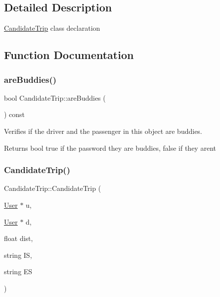 \subsection{Detailed Description}
\hyperlink{class_candidate_trip}{Candidate\+Trip} class declaration 

\subsection{Function Documentation}
\mbox{\label{group___candidate_trip_ga5857725c938706a05eddef0102bf9456}} 
\subsubsection{\texorpdfstring{are\+Buddies()}{areBuddies()}}
{\footnotesize\ttfamily bool Candidate\+Trip\+::are\+Buddies (\begin{DoxyParamCaption}{ }\end{DoxyParamCaption}) const}



Verifies if the driver and the passenger in this object are buddies. 

\begin{DoxyReturn}{Returns}
bool true if the password they are buddies, false if they aren\textquotesingle{}t 
\end{DoxyReturn}
\mbox{\label{group___candidate_trip_gad9ecdfcf0d01c7d88a92a132a7f3bc67}} 
\subsubsection{\texorpdfstring{Candidate\+Trip()}{CandidateTrip()}}
{\footnotesize\ttfamily Candidate\+Trip\+::\+Candidate\+Trip (\begin{DoxyParamCaption}\item[{\hyperlink{class_user}{User} $\ast$}]{u,  }\item[{\hyperlink{class_user}{User} $\ast$}]{d,  }\item[{float}]{dist,  }\item[{string}]{IS,  }\item[{string}]{ES }\end{DoxyParamCaption})}



